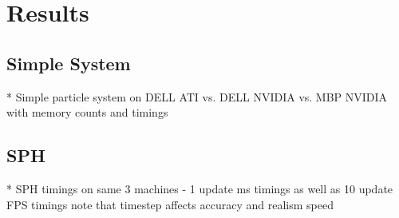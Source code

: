 \chapter{Results}
\section{Simple System}
* Simple particle system on DELL ATI vs. DELL NVIDIA vs. MBP NVIDIA
    with memory counts and timings


\begin{comment}
\begin{figure}[!htc]
 		\centering
		\texttt{[image: figures/sph\_timing.png]}
		\label{fig:logic}
        \caption{ Simple Timings }
\end{figure}
\end{comment}


\section{SPH}
* SPH timings on same 3 machines - 1 update ms timings 
    as well as 10 update FPS timings
    note that timestep affects accuracy and realism speed

\begin{comment}
\begin{figure}[!htc]
 		\centering
		\texttt{[image: figures/sph\_timing.png]}
		\label{fig:logic}
        \caption{ SPH Timings }
\end{figure}
\end{comment}


